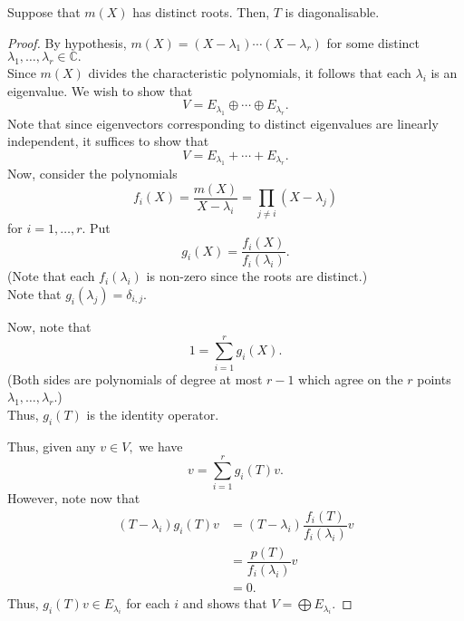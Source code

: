 \begin{prop}
	Suppose that $m(X)$ has distinct roots. Then, $T$ is diagonalisable.
\end{prop}
\begin{proof} 
	By hypothesis, $m(X) = (X - \lambda_1)\cdots(X - \lambda_r)$ for some distinct $\lambda_1, \ldots, \lambda_r \in \mathbb{C}.$\\
	Since $m(X)$ divides the characteristic polynomials, it follows that each $\lambda_i$ is an eigenvalue. We wish to show that
	\begin{equation*} 
		V = E_{\lambda_1} \oplus \cdots \oplus E_{\lambda_r}.
	\end{equation*}
	Note that since eigenvectors corresponding to distinct eigenvalues are linearly independent, it suffices to show that
	\begin{equation*} 
		V = E_{\lambda_1} + \cdots + E_{\lambda_r}.
	\end{equation*}
	Now, consider the polynomials
	\begin{equation*} 
		f_i(X) = \dfrac{m(X)}{X - \lambda_i} = \prod_{j \neq i}(X - \lambda_j)
	\end{equation*}
	for $i = 1, \ldots, r.$ Put
	\begin{equation*} 
		g_i(X) = \dfrac{f_i(X)}{f_i(\lambda_i)}.
	\end{equation*}
	(Note that each $f_i(\lambda_i)$ is non-zero since the roots are distinct.)\\
	Note that $g_i(\lambda_j) = \delta_{i, j}.$

	Now, note that
	\begin{equation*} 
		1 = \sum_{i = 1}^{r} g_i(X).
	\end{equation*}
	(Both sides are polynomials of degree at most $r - 1$ which agree on the $r$ points $\lambda_1, \ldots, \lambda_r.$)\\
	Thus, $g_i(T)$ is the identity operator.

	Thus, given any $v \in V,$ we have
	\begin{equation} \tag{$\sum$} \label{eq:sumeigenvectors}
		v = \sum_{i = 1}^{r} g_i(T)v.
	\end{equation}
	However, note now that
	\begin{align*} 
		(T - \lambda_i)g_i(T)v &= (T - \lambda_i)\dfrac{f_i(T)}{f_i(\lambda_i)}v\\
		&= \dfrac{p(T)}{f_i(\lambda_i)}v\\
		&= 0.
	\end{align*}
	Thus, $g_i(T)v \in E_{\lambda_i}$ for each $i$ and  shows that $V = \bigoplus E_{\lambda_i}.$ 
\end{proof}	

